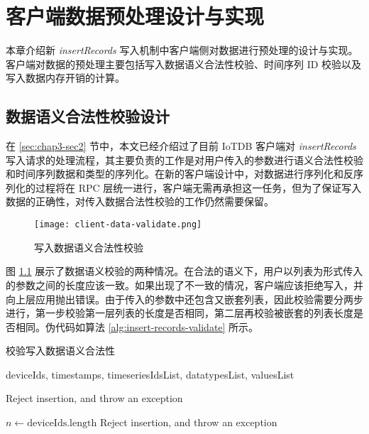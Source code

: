 
\chapter{客户端数据预处理设计与实现\label{chap:client-design}}
本章介绍新 \emph{insertRecords} 写入机制中客户端侧对数据进行预处理的设计与实现。客户端对数据的预处理主要包括写入数据语义合法性校验、时间序列 ID 校验以及写入数据内存开销的计算。
\section{数据语义合法性校验设计}
在 \ref{sec:chap3-sec2} 节中，本文已经介绍过了目前 IoTDB 客户端对 \emph{insertRecords} 写入请求的处理流程，其主要负责的工作是对用户传入的参数进行语义合法性校验和时间序列数据和类型的序列化。在新的客户端设计中，对数据进行序列化和反序列化的过程将在 RPC 层统一进行，客户端无需再承担这一任务，但为了保证写入数据的正确性，对传入数据合法性校验的工作仍然需要保留。

\begin{figure}
  \centering
  \texttt{[image: client-data-validate.png]}
  \caption{写入数据语义合法性校验}
  \label{fig:client-data-validate}
\end{figure}

图 \ref{fig:client-data-validate} 展示了数据语义校验的两种情况。在合法的语义下，用户以列表为形式传入的参数之间的长度应该一致。如果出现了不一致的情况，客户端应该拒绝写入，并向上层应用抛出错误。由于传入的参数中还包含又嵌套列表，因此校验需要分两步进行，第一步校验第一层列表的长度是否相同，第二层再校验被嵌套的列表长度是否相同。伪代码如算法 \ref{alg:insert-records-validate} 所示。

\begin{algorithm}
  \caption{校验写入数据语义合法性}
  \label{alg:insert-records-validate}
  \small
  \begin{algorithmic}
    \REQUIRE deviceIds, timestamps, timeseriesIdsList, datatypesList, valuesList

     \STATE Reject insertion, and throw an exception
    \ENDIF

    \STATE $n \leftarrow \text{deviceIds.length}$
        \STATE Reject insertion, and throw an exception
      \ENDIF
    \ENDFOR

  \end{algorithmic}
\end{algorithm}

